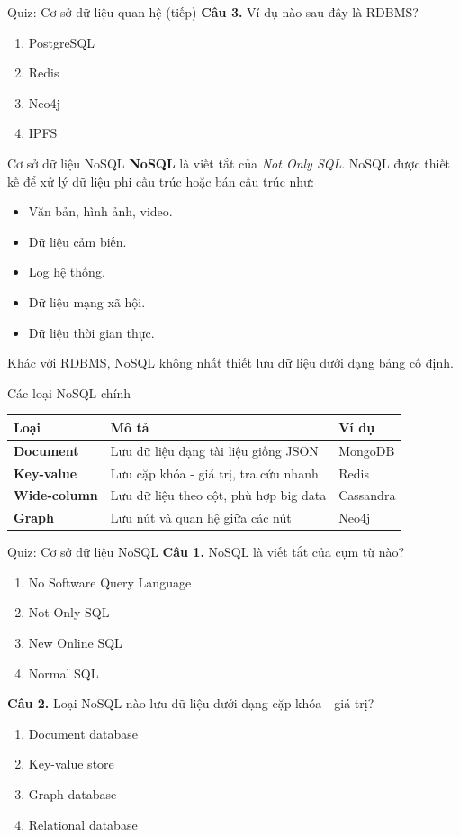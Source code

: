 ﻿\documentclass[aspectratio=169,11pt]{beamer}
\newcommand{\keyword}[1]{\textcolor{accent}{\textbf{#1}}}
\newcommand{\tightlist}{\setlength{\itemsep}{2pt}\setlength{\parskip}{0pt}}
\newcommand{\qoption}[2]{\item[#1.] #2}
\begin{document}
\begin{frame}{Quiz: Cơ sở dữ liệu quan hệ (tiếp)}
\small
\textbf{Câu 3.} Ví dụ nào sau đây là RDBMS?
\begin{enumerate}
\tightlist
  \qoption{A}{PostgreSQL}
  \qoption{B}{Redis}
  \qoption{C}{Neo4j}
  \qoption{D}{IPFS}
\end{enumerate}
\end{frame}

\begin{frame}{Cơ sở dữ liệu NoSQL}
\small
\keyword{NoSQL} là viết tắt của \textit{Not Only SQL}. NoSQL được thiết kế để xử lý dữ liệu phi cấu trúc hoặc bán cấu trúc như:
\begin{itemize}
\tightlist
  \item Văn bản, hình ảnh, video.
  \item Dữ liệu cảm biến.
  \item Log hệ thống.
  \item Dữ liệu mạng xã hội.
  \item Dữ liệu thời gian thực.
\end{itemize}

Khác với RDBMS, NoSQL không nhất thiết lưu dữ liệu dưới dạng bảng cố định.
\end{frame}

\begin{frame}{Các loại NoSQL chính}
\small
\begin{tabularx}{\textwidth}{>{\bfseries}p{} X p{}}
\toprule
Loại & Mô tả & Ví dụ \\
\midrule
Document & Lưu dữ liệu dạng tài liệu giống JSON & MongoDB \\
Key-value & Lưu cặp khóa - giá trị, tra cứu nhanh & Redis \\
Wide-column & Lưu dữ liệu theo cột, phù hợp big data & Cassandra \\
Graph & Lưu nút và quan hệ giữa các nút & Neo4j \\
\bottomrule
\end{tabularx}
\end{frame}

\begin{frame}{Quiz: Cơ sở dữ liệu NoSQL}
\small
\textbf{Câu 1.} NoSQL là viết tắt của cụm từ nào?
\begin{enumerate}
\tightlist
  \qoption{A}{No Software Query Language}
  \qoption{B}{Not Only SQL}
  \qoption{C}{New Online SQL}
  \qoption{D}{Normal SQL}
\end{enumerate}

\textbf{Câu 2.} Loại NoSQL nào lưu dữ liệu dưới dạng cặp khóa - giá trị?
\begin{enumerate}
\tightlist
  \qoption{A}{Document database}
  \qoption{B}{Key-value store}
  \qoption{C}{Graph database}
  \qoption{D}{Relational database}
\end{enumerate}
\end{frame}
\end{document}
